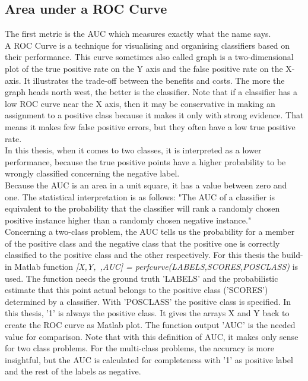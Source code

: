 \subsection{Area under a ROC Curve}
The first metric is the \ac{AUC} which measures exactly what the name says.\cite[p. 13]{Fawcett.}\\
A \ac{ROC} Curve is a technique for visualising and organising classifiers based on their performance.
This curve sometimes also called graph is a two-dimensional plot of the true positive rate on the Y axis and the false positive rate on the X-axis.
It illustrates the trade-off between the benefits and costs.
The more the graph heads north west, the better is the classifier.
Note that if a classifier has a low \ac{ROC} curve near the X axis, then it may be conservative in making an assignment to a positive class because it makes it only with strong evidence.
That means it makes few false positive errors, but they often have a low true positive rate.\cite[p. 4]{Fawcett.}\\
In this thesis, when it comes to two classes, it is interpreted as a lower performance, because the true positive points have a higher probability to be wrongly classified concerning the
negative label.\\
Because the \ac{AUC} is an area in a unit square, it has a value between zero and one.
The statistical interpretation is as follows: "The \acs{AUC} of a classifier is equivalent to the probability that the classifier will rank a randomly chosen positive instance higher than a randomly chosen negative instance."\cite[p. 13-16]{Fawcett.} \\
Concerning a two-class problem, the \acs{AUC} tells us the probability for a member of the positive class and the negative class that the positive one is correctly classified to the positive class and the other respectively. 
For this thesis the build-in Matlab function \textit{[X,Y,~,AUC] = perfcurve(LABELS,SCORES,POSCLASS)} is used.
The function needs the ground truth 'LABELS' and the probabilistic estimate that this point actual belongs to the positive class ('SCORES') determined by a classifier.
With 'POSCLASS' the positive class is specified. In this thesis, '1' is always the positive class.
It gives the arrays X and Y back to create the ROC curve as Matlab plot.
The function output 'AUC' is the needed value for comparison.
Note that with this definition of \acs{AUC}, it makes only sense for two class problems.
For the multi-class problems, the accuracy is more insightful, but the \acs{AUC} is calculated for completeness with '1' as positive label and the rest of the labels as negative.\\
